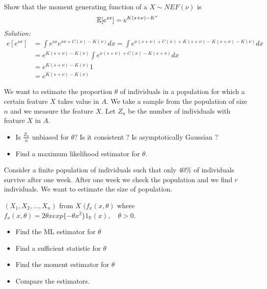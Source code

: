 \begin{ex}
	Show that the moment generating function of a \rv $X\sim NEF(\nu)$ is
	$$\mathbb{E}[e^{sx}]=e^{K(s+\nu)-K^\nu}$$
\textit{Solution:}
\[
\begin{split}
e[e^{sx}]
&=\int e^{sx}e^{x\nu+C(x)-K(\nu)}dx=\int e^{x(s+\nu)+C(x)+K(s+\nu)-K(s+\nu)-K(\nu)}dx\\
&=e^{K(s+\nu)-K(\nu)}\int e^{x(s+\nu)+C(x)-K(s+\nu)}dx\\
&=e^{K(s+\nu)-K(\nu)} 1\\
&=e^{K(s+\nu)-K(\nu)}
	\end{split}
	\]
\end{ex}



\begin{ex}
	We want to estimate the proportion $\theta$ of individuals in a population for which a certain feature $X$ takes value in $A$. We take a sample from the population of size $n$ and we measure the feature $X$. Let $Z_n$ be the number of individuals with feature $X$ in $A$. 
	\begin{itemize}
		\item
		Is $\frac{Z_n}{n}$ unbiased for $\theta$? Is it consistent ? Is asymptotically Gaussian ?
		\item
		Find a maximum likelihood estimator for $\theta$. 
	\end{itemize}
\end{ex}



\begin{ex}
	Consider a finite population of individuals such that only $40\%$ of individuals survive after one week. After one week we check the population and we find $r$ individuals. We want to estimate the size of population.
\end{ex}  

\begin{ex}
	$(X_1,X_2,\ldots,X_n)$ from $X$ $(f_x(x,\theta)$ where $f_x(x,\theta)=2\theta x exp\{ -\theta x^2\} 1_{\mathbb{R}}(x), \quad \theta > 0$.
	\begin{itemize}
		\item
		Find the ML estimator for $\theta$
		\item
		Find a sufficient statistic for $\theta$
		\item
		Find the moment estimator for $\theta$
		\item
		Compare the estimators.
	\end{itemize}
\end{ex}
